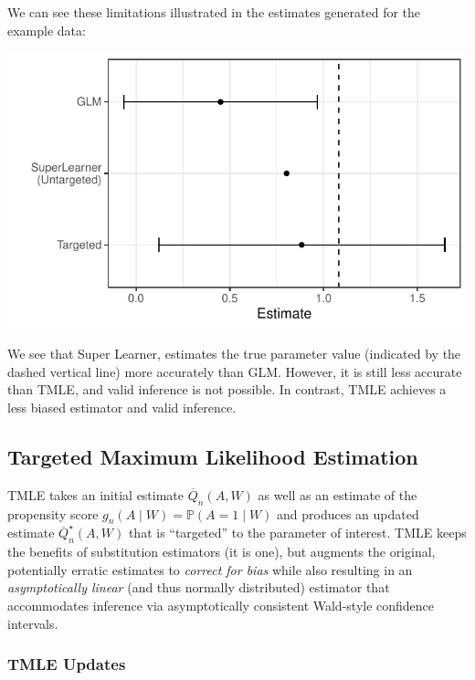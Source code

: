 \documentclass[12pt, krantz2,]{krantz}
\theoremstyle{definition}
\theoremstyle{definition}
\theoremstyle{definition}
\newcommand{\1}{\mathbbm{1}}
\begin{document}
We can see these limitations illustrated in the estimates generated for the
example data:

\begin{center}\includegraphics[width=0.8\linewidth]{img/misc/tmle_sim/schematic_3_effects} \end{center}

We see that Super Learner, estimates the true parameter value (indicated by the
dashed vertical line) more accurately than GLM. However, it is still less
accurate than TMLE, and valid inference is not possible. In contrast, TMLE
achieves a less biased estimator and valid inference.

\hypertarget{tmle}{%
\subsection{Targeted Maximum Likelihood Estimation}\label{tmle}}

TMLE takes an initial estimate \(\overline{Q}_n(A,W)\) as well as an estimate of
the propensity score \(g_n(A \mid W) = \mathbb{P}(A = 1 \mid W)\) and produces an
updated estimate \(\overline{Q}^{\star}_n(A,W)\) that is ``targeted'' to the
parameter of interest. TMLE keeps the benefits of substitution estimators (it is
one), but augments the original, potentially erratic estimates to \emph{correct for
bias} while also resulting in an \emph{asymptotically linear} (and thus normally
distributed) estimator that accommodates inference via asymptotically consistent
Wald-style confidence intervals.

\hypertarget{tmle-updates}{%
\subsubsection{TMLE Updates}\label{tmle-updates}}
\end{document}
